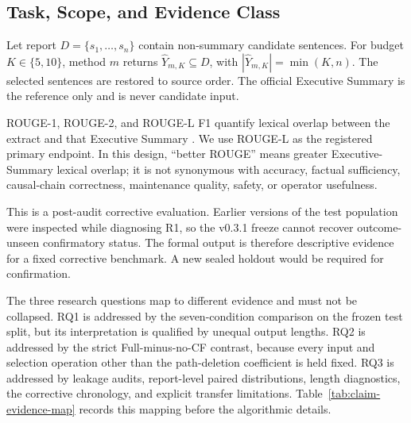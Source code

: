\documentclass[applsci,article,submit,moreauthors]{Definitions/mdpi}
\begin{document}
\subsection{Task, Scope, and Evidence Class}

Let report $D=\{s_1,\ldots,s_n\}$ contain non-summary candidate sentences. For budget $K\in\{5,10\}$, method $m$ returns $\hat{Y}_{m,K}\subseteq D$, with $|\hat{Y}_{m,K}|=\min(K,n)$. The selected sentences are restored to source order. The official Executive Summary is the reference only and is never candidate input.

ROUGE-1, ROUGE-2, and ROUGE-L F1 quantify lexical overlap between the extract and that Executive Summary \cite{lin2004rouge}. We use ROUGE-L as the registered primary endpoint. In this design, ``better ROUGE'' means greater Executive-Summary lexical overlap; it is not synonymous with accuracy, factual sufficiency, causal-chain correctness, maintenance quality, safety, or operator usefulness.

This is a post-audit corrective evaluation. Earlier versions of the test population were inspected while diagnosing R1, so the v0.3.1 freeze cannot recover outcome-unseen confirmatory status. The formal output is therefore descriptive evidence for a fixed corrective benchmark. A new sealed holdout would be required for confirmation.

The three research questions map to different evidence and must not be collapsed. RQ1 is addressed by the seven-condition comparison on the frozen test split, but its interpretation is qualified by unequal output lengths. RQ2 is addressed by the strict Full-minus-no-CF contrast, because every input and selection operation other than the path-deletion coefficient is held fixed. RQ3 is addressed by leakage audits, report-level paired distributions, length diagnostics, the corrective chronology, and explicit transfer limitations. Table~\ref{tab:claim-evidence-map} records this mapping before the algorithmic details.
\end{document}

